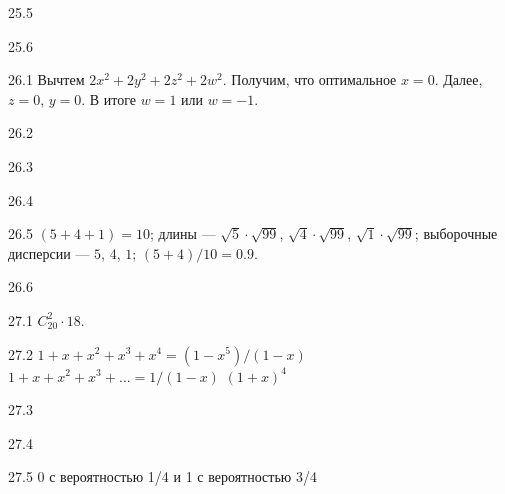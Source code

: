 \protect \hypertarget {soln:25.5}{}
\begin{solution}{{25.5}}

\end{solution}
\protect \hypertarget {soln:25.6}{}
\begin{solution}{{25.6}}

\end{solution}
\protect \hypertarget {soln:26.1}{}
\begin{solution}{{26.1}}
Вычтем $2x^2 + 2y^2 + 2z^2 + 2w^2$. Получим, что оптимальное $x=0$. Далее, $z=0$, $y=0$. В итоге $w=1$ или $w=-1$.
\end{solution}
\protect \hypertarget {soln:26.2}{}
\begin{solution}{{26.2}}

\end{solution}
\protect \hypertarget {soln:26.3}{}
\begin{solution}{{26.3}}
\end{solution}
\protect \hypertarget {soln:26.4}{}
\begin{solution}{{26.4}}
\end{solution}
\protect \hypertarget {soln:26.5}{}
\begin{solution}{{26.5}}
$(5+4+1)=10$; длины — $\sqrt{5}\cdot\sqrt{99}$, $\sqrt{4}\cdot\sqrt{99}$, $\sqrt{1}\cdot\sqrt{99}$; выборочные дисперсии — $5$, $4$, $1$; $(5+4)/10=0.9$.
\end{solution}
\protect \hypertarget {soln:26.6}{}
\begin{solution}{{26.6}}
\end{solution}
\protect \hypertarget {soln:27.1}{}
\begin{solution}{{27.1}}
$C_{20}^2\cdot 18$.
\end{solution}
\protect \hypertarget {soln:27.2}{}
\begin{solution}{{27.2}}
  $1+x+x^2+x^3+x^4=(1-x^5)/(1-x)$
  $1+x+x^2+x^3+\ldots = 1/(1-x)$
  $(1+x)^4$
\end{solution}
\protect \hypertarget {soln:27.3}{}
\begin{solution}{{27.3}}
\end{solution}
\protect \hypertarget {soln:27.4}{}
\begin{solution}{{27.4}}
\end{solution}
\protect \hypertarget {soln:27.5}{}
\begin{solution}{{27.5}}
  0 с вероятностью 1/4 и 1 с вероятностью 3/4
\end{solution}
\protect \hypertarget {soln:27.6}{}
